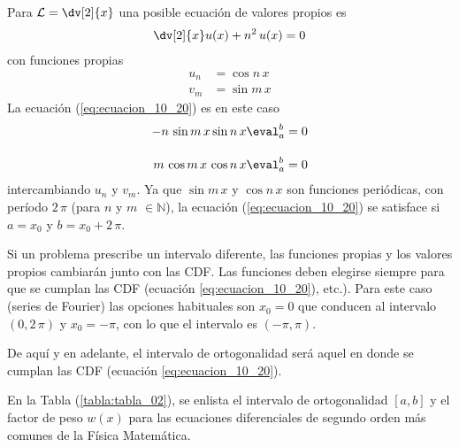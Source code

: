 Para $\displaystyle \mathcal{L} = \dv[2]{x}$ una posible ecuación de valores propios es
\begin{align}
\dv[2]{x} u(x) + n^{2} \, u(x) = 0
\label{eq:ecuacion_10_21}
\end{align}
con funciones propias
\begin{align*}
u_{n} &= \cos n \, x \\
v_{m} &= \sin m \, x
\end{align*}
La ecuación (\ref{eq:ecuacion_10_20}) es en este caso
\begin{align*}
- n \, \sin m \, x \sin n \, x \eval^{b}_{a} &= 0 \\[1em]
m \, \cos m \, x \, \cos n \, x \eval^{b}_{a} &= 0 
\end{align*}
intercambiando $u_{n}$ y $v_{m}$. Ya que $\sin m \, x$ y $\cos n \, x$ son funciones periódicas, con período $2 \, \pi$ (para $n$ y $m$ $\in \mathbb{N}$), la ecuación (\ref{eq:ecuacion_10_20}) se satisface si $a = x_{0}$ y $b = x_{0} + 2 \, \pi$.
\par
Si un problema prescribe un intervalo diferente, las funciones propias y los valores propios cambiarán junto con las CDF. Las funciones deben elegirse siempre para que se cumplan las CDF (ecuación \ref{eq:ecuacion_10_20}), etc.). Para este caso (series de Fourier) las opciones habituales son $x_{0} = 0$ que conducen al intervalo $(0, 2 \, \pi)$ y $x_{0} = - \pi$, con lo que el intervalo es $(-\pi, \pi)$.
\par
De aquí y en adelante, el intervalo de ortogonalidad será aquel en donde se cumplan las CDF (ecuación \ref{eq:ecuacion_10_20}).
\par
En la Tabla (\ref{tabla:tabla_02}), se enlista el intervalo de ortogonalidad $[a, b]$ y el factor de peso $w (x)$ para las ecuaciones diferenciales de segundo orden más comunes de la Física Matemática.
